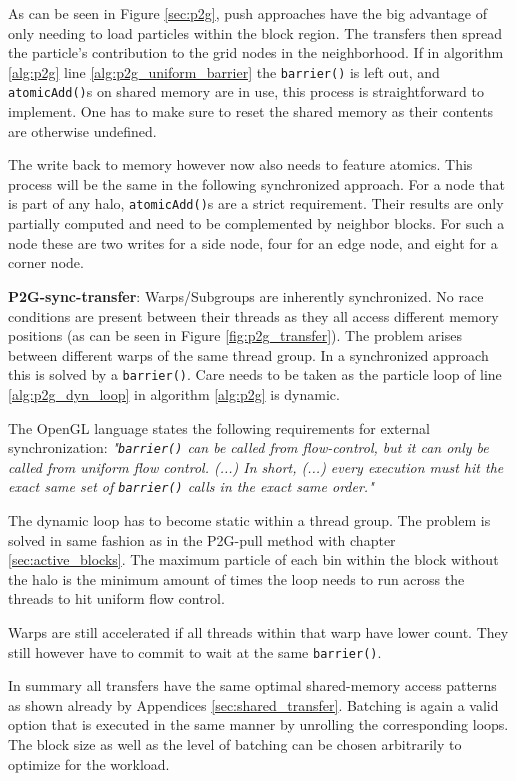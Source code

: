 \documentclass[m,times]{cgMA}
\begin{document}
As can be seen in Figure \ref{sec:p2g}, push approaches have the big advantage of only needing to load particles within the block region. The transfers then spread the particle's contribution to the grid nodes in the neighborhood. If in algorithm \ref{alg:p2g} line \ref{alg:p2g_uniform_barrier} the \texttt{barrier()} is left out, and \texttt{atomicAdd()}s on shared memory are in use, this process is straightforward to implement. One has to make sure to reset the shared memory as their contents are otherwise undefined.

The write back to memory however now also needs to feature atomics. This process will be the same in the following synchronized approach. For a node that is part of any halo, \texttt{atomicAdd()}s are a strict requirement. Their results are only partially computed and need to be complemented by neighbor blocks. For such a node these are two writes for a side node, four for an edge node, and eight for a corner node.

\textbf{P2G-sync-transfer}: Warps/Subgroups are inherently synchronized. No race conditions are present between their threads as they all access different memory positions (as can be seen in Figure \ref{fig:p2g_transfer}). The problem arises between different warps of the same thread group. In a synchronized approach this is solved by a \texttt{barrier()}. Care needs to be taken as the particle loop of line \ref{alg:p2g_dyn_loop} in algorithm \ref{alg:p2g} is dynamic.

The OpenGL language states the following requirements for external synchronization:
\textit{"\texttt{barrier()} can be called from flow-control, but it can only be called from uniform flow control. (...) In short, (...) every execution must hit the exact same set of \texttt{barrier()} calls in the exact same order."} \cite{KHRONOS:BARRIER}

The dynamic loop has to become static within a thread group. The problem is solved in same fashion as in the P2G-pull method with chapter \ref{sec:active_blocks}. The maximum particle of each bin within the block without the halo is the minimum amount of times the loop needs to run across the threads to hit uniform flow control.

Warps are still accelerated if all threads within that warp have lower count. They still however have to commit to wait at the same \texttt{barrier()}.

In summary all transfers have the same optimal shared-memory access patterns as shown already by Appendices \ref{sec:shared_transfer}. Batching is again a valid option that is executed in the same manner by unrolling the corresponding loops. The block size as well as the level of batching can be chosen arbitrarily to optimize for the workload.
\end{document}
